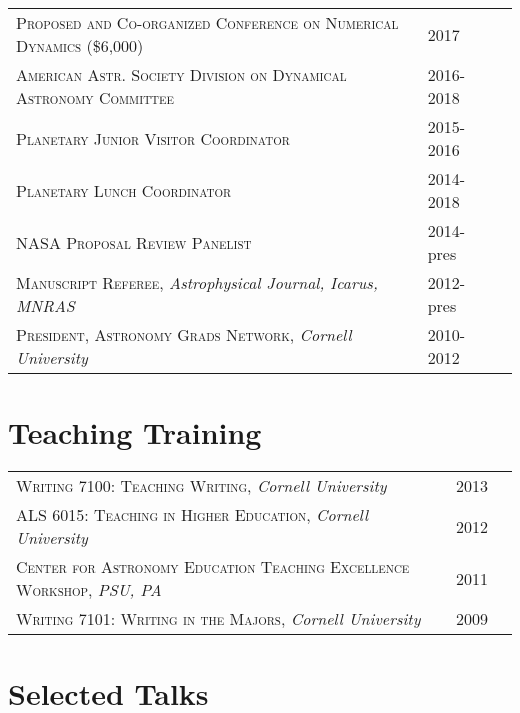 \documentclass[10pt]{article} %
\begin{document}
\begin{tabular}{l>{\hfill}p{3.0cm}r}
\textsc{Proposed and Co-organized Conference on Numerical Dynamics} \footnotesize(\$6,000)\normalsize & 2017 \\
\textsc{American Astr. Society Division on Dynamical Astronomy Committee} & 2016-2018 \\
\textsc{Planetary Junior Visitor Coordinator} & 2015-2016 \\
\textsc{Planetary Lunch Coordinator} & 2014-2018 \\
\textsc{NASA Proposal Review Panelist} & 2014-pres\\
\textsc{Manuscript Referee}, {\it Astrophysical Journal, Icarus, MNRAS} & 2012-pres\\
\textsc{President, Astronomy Grads Network}, {\it Cornell University} & 2010-2012\\
\end{tabular}


\section{Teaching Training}

\begin{tabular}{l>{\hfill}p{2.1cm}r}
\textsc{Writing 7100:  Teaching Writing}, {\it Cornell University} & 2013 \\
\textsc{ALS 6015:  Teaching in Higher Education}, {\it Cornell University} & 2012\\
\textsc{Center for Astronomy Education Teaching Excellence Workshop}, {\it PSU, PA} & 2011 \\
\textsc{Writing 7101: Writing in the Majors}, {\it Cornell University} & 2009 \\
\end{tabular}


\section{Selected Talks}
\end{document}
